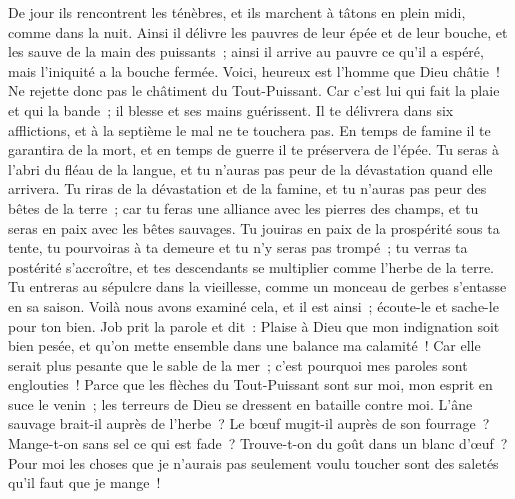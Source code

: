 \begin{multicols}{2}
De jour ils rencontrent les ténèbres, et ils marchent à tâtons en plein midi, comme dans la nuit.
Ainsi il délivre les pauvres de leur épée et de leur bouche, et les sauve de la main des puissants~;
ainsi il arrive au pauvre ce qu'il a espéré, mais l'iniquité a la bouche fermée.
Voici, heureux est l'homme que Dieu châtie~! Ne rejette donc pas le châtiment du Tout-Puissant.
Car c'est lui qui fait la plaie et qui la bande~; il blesse et ses mains guérissent.
Il te délivrera dans six afflictions, et à la septième le mal ne te touchera pas.
En temps de famine il te garantira de la mort, et en temps de guerre il te préservera de l'épée.
Tu seras à l'abri du fléau de la langue, et tu n'auras pas peur de la dévastation quand elle arrivera.
Tu riras de la dévastation et de la famine, et tu n'auras pas peur des bêtes de la terre~;
car tu feras une alliance avec les pierres des champs, et tu seras en paix avec les bêtes sauvages.
Tu jouiras en paix de la prospérité sous ta tente, tu pourvoiras à ta demeure et tu n'y seras pas trompé~;
tu verras ta postérité s'accroître, et tes descendants se multiplier comme l'herbe de la terre.
Tu entreras au sépulcre dans la vieillesse, comme un monceau de gerbes s'entasse en sa saison.
Voilà nous avons examiné cela, et il est ainsi~; écoute-le et sache-le pour ton bien.
\VerseOne{}Job prit la parole et dit~:
Plaise à Dieu que mon indignation soit bien pesée, et qu'on mette ensemble dans une balance ma calamité~!
Car elle serait plus pesante que le sable de la mer~; c'est pourquoi mes paroles sont englouties~!
Parce que les flèches du Tout-Puissant sont sur moi, mon esprit en suce le venin~; les terreurs de Dieu se dressent en bataille contre moi.
L'âne sauvage brait-il auprès de l'herbe~? Le bœuf mugit-il auprès de son fourrage~?
Mange-t-on sans sel ce qui est fade~? Trouve-t-on du goût dans un blanc d'œuf~?
Pour moi les choses que je n'aurais pas seulement voulu toucher sont des saletés qu'il faut que je mange~!

\end{multicols}
